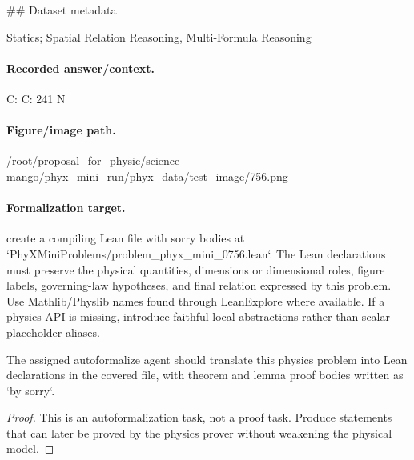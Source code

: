 \#\# Dataset metadata

Statics; Spatial Relation Reasoning, Multi-Formula Reasoning

\paragraph{Recorded answer/context.}
C: C: 241 N

\paragraph{Figure/image path.}
/root/proposal\_for\_physic/science-mango/phyx\_mini\_run/phyx\_data/test\_image/756.png

\paragraph{Formalization target.}
create a compiling Lean file with sorry bodies at `PhyXMiniProblems/problem\_phyx\_mini\_0756.lean`. The Lean declarations must preserve the physical quantities, dimensions or dimensional roles, figure labels, governing-law hypotheses, and final relation expressed by this problem.
Use Mathlib/Physlib names found through LeanExplore where available. If a physics API is missing, introduce faithful local abstractions rather than scalar placeholder aliases.

\begin{theorem}
\label{thm:physics:phyx_mini_0756:target}
The assigned autoformalize agent should translate this physics problem into Lean declarations in the covered file, with theorem and lemma proof bodies written as `by sorry`.
\end{theorem}
\begin{proof}
This is an autoformalization task, not a proof task. Produce statements that can later be proved by the physics prover without weakening the physical model.
\end{proof}

